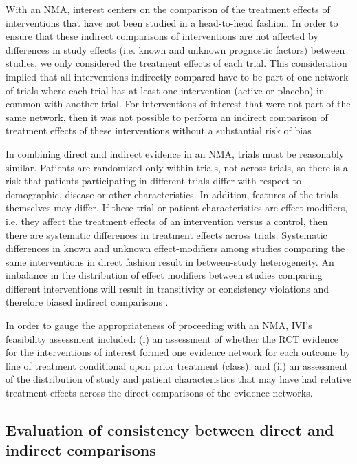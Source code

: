 \documentclass[11pt,final,fleqn]{article}\usepackage[]{graphicx}\usepackage[]{color}
\theoremstyle{plain}
\begin{document}
{\begin{appendices}
With an NMA, interest centers on the comparison of the treatment effects of interventions that have not been studied in a head-to-head fashion. In order to ensure that these indirect comparisons of interventions are not affected by differences in study effects (i.e. known and unknown prognostic factors) between studies, we only considered the treatment effects of each trial. This consideration implied that all interventions indirectly compared have to be part of one network of trials where each trial has at least one intervention (active or placebo) in common with another trial. For interventions of interest that were not part of the same network, then it was not possible to perform an indirect comparison of treatment effects of these interventions without a substantial risk of bias \citep{jansen2014indirect, dias2018network}.

In combining direct and indirect evidence in an NMA, trials must be reasonably similar. Patients are randomized only within trials, not across trials, so there is a risk that patients participating in different trials differ with respect to demographic, disease or other characteristics. In addition, features of the trials themselves may differ. If these trial or patient characteristics are effect modifiers, i.e. they affect the treatment effects of an intervention versus a control, then there are systematic differences in treatment effects across trials. Systematic differences in known and unknown effect-modifiers among studies comparing the same interventions in direct fashion result in between-study heterogeneity. An imbalance in the distribution of effect modifiers between studies comparing different interventions will result in transitivity or consistency violations and therefore biased indirect comparisons \citep{jansen2012directed, jansen2013multivariate}.

In order to gauge the appropriateness of proceeding with an NMA, IVI's feasibility assessment included: (i) an assessment of whether the RCT evidence for the interventions of interest formed one evidence network for each outcome by line of treatment conditional upon prior treatment (class); and (ii) an assessment of the distribution of study and patient characteristics that may have had relative treatment effects across the direct comparisons of the evidence networks.

\subsection{Evaluation of consistency between direct and indirect comparisons}


\end{appendices}}
\end{document}
